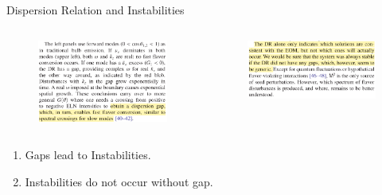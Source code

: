 \documentclass[9pt]{beamer}
\begin{document}
\begin{darkframes}
\begin{frame}{Dispersion Relation and Instabilities}
\begin{tcolorbox}
\begin{columns}[T]
   \begin{column}{0.5\textwidth}
      \begin{figure}
         \includegraphics[width=\textwidth]{assets/dr/izaguirre2.jpg}
      \end{figure}
   \end{column}%
   \begin{column}{0.5\textwidth}
      \begin{figure}
         \includegraphics[width=\textwidth]{assets/dr/izaguirre3.jpg}
      \end{figure}
   \end{column}
\end{columns}
\end{tcolorbox}


\vspace{-0.8em}
\begin{enumerate}
   \item Gaps lead to Instabilities.
   \item Instabilities do not occur without gap.
\end{enumerate}


\end{frame}
\end{darkframes}
\end{document}
